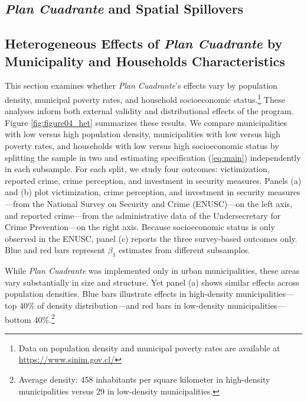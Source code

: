 \subsection{\emph{Plan Cuadrante} and Spatial Spillovers}
\label{sec:spillovers}


\subsection{Heterogeneous Effects of \emph{Plan Cuadrante} by Municipality and Households Characteristics}
\label{heterogeneity}

This section examines whether \emph{Plan Cuadrante}'s effects vary by population density, municipal poverty rates, and household socioeconomic status.\footnote{Data on population density and municipal poverty rates are available at \url{https://www.sinim.gov.cl/}} These analyses inform both external validity and distributional effects of the program. Figure \ref{fig:figure04_het} summarizes these results. We compare municipalities with low versus high population density, municipalities with low versus high poverty rates, and households with low versus high socioeconomic status by splitting the sample in two and estimating specification (\ref{eq:main}) independently in each subsample. For each split, we study four outcomes: victimization, reported crime, crime perception, and investment in security measures. Panels (a) and (b) plot victimization, crime perception, and investment in security measures---from the National Survey on Security and Crime (ENUSC)---on the left axis, and reported crime---from the administrative data of the Undersecretary for Crime Prevention---on the right axis. Because socioeconomic status is only observed in the ENUSC, panel (c) reports the three survey-based outcomes only. Blue and red bars represent $\beta_1$ estimates from different subsamples.

\FloatBarrier

\FloatBarrier

While \emph{Plan Cuadrante} was implemented only in urban municipalities, these areas vary substantially in size and structure. Yet panel (a) shows similar effects across population densities. Blue bars illustrate effects in high-density municipalities---top 40\% of density distribution---and red bars in low-density municipalities---bottom 40\%.\footnote{Average density: 458 inhabitants per square kilometer in high-density municipalities versus 29 in low-density municipalities.}

